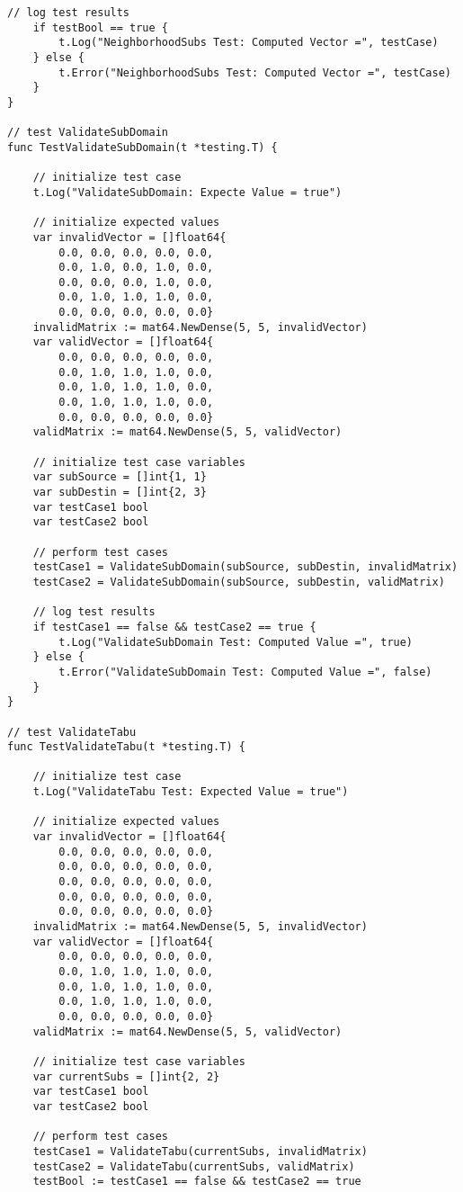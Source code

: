 \begin{lstlisting}[basicstyle=\tiny]
	// log test results
	if testBool == true {
		t.Log("NeighborhoodSubs Test: Computed Vector =", testCase)
	} else {
		t.Error("NeighborhoodSubs Test: Computed Vector =", testCase)
	}
}

// test ValidateSubDomain
func TestValidateSubDomain(t *testing.T) {

	// initialize test case
	t.Log("ValidateSubDomain: Expecte Value = true")

	// initialize expected values
	var invalidVector = []float64{
		0.0, 0.0, 0.0, 0.0, 0.0,
		0.0, 1.0, 0.0, 1.0, 0.0,
		0.0, 0.0, 0.0, 1.0, 0.0,
		0.0, 1.0, 1.0, 1.0, 0.0,
		0.0, 0.0, 0.0, 0.0, 0.0}
	invalidMatrix := mat64.NewDense(5, 5, invalidVector)
	var validVector = []float64{
		0.0, 0.0, 0.0, 0.0, 0.0,
		0.0, 1.0, 1.0, 1.0, 0.0,
		0.0, 1.0, 1.0, 1.0, 0.0,
		0.0, 1.0, 1.0, 1.0, 0.0,
		0.0, 0.0, 0.0, 0.0, 0.0}
	validMatrix := mat64.NewDense(5, 5, validVector)

	// initialize test case variables
	var subSource = []int{1, 1}
	var subDestin = []int{2, 3}
	var testCase1 bool
	var testCase2 bool

	// perform test cases
	testCase1 = ValidateSubDomain(subSource, subDestin, invalidMatrix)
	testCase2 = ValidateSubDomain(subSource, subDestin, validMatrix)

	// log test results
	if testCase1 == false && testCase2 == true {
		t.Log("ValidateSubDomain Test: Computed Value =", true)
	} else {
		t.Error("ValidateSubDomain Test: Computed Value =", false)
	}
}

// test ValidateTabu
func TestValidateTabu(t *testing.T) {

	// initialize test case
	t.Log("ValidateTabu Test: Expected Value = true")

	// initialize expected values
	var invalidVector = []float64{
		0.0, 0.0, 0.0, 0.0, 0.0,
		0.0, 0.0, 0.0, 0.0, 0.0,
		0.0, 0.0, 0.0, 0.0, 0.0,
		0.0, 0.0, 0.0, 0.0, 0.0,
		0.0, 0.0, 0.0, 0.0, 0.0}
	invalidMatrix := mat64.NewDense(5, 5, invalidVector)
	var validVector = []float64{
		0.0, 0.0, 0.0, 0.0, 0.0,
		0.0, 1.0, 1.0, 1.0, 0.0,
		0.0, 1.0, 1.0, 1.0, 0.0,
		0.0, 1.0, 1.0, 1.0, 0.0,
		0.0, 0.0, 0.0, 0.0, 0.0}
	validMatrix := mat64.NewDense(5, 5, validVector)

	// initialize test case variables
	var currentSubs = []int{2, 2}
	var testCase1 bool
	var testCase2 bool

	// perform test cases
	testCase1 = ValidateTabu(currentSubs, invalidMatrix)
	testCase2 = ValidateTabu(currentSubs, validMatrix)
	testBool := testCase1 == false && testCase2 == true


\end{lstlisting}
